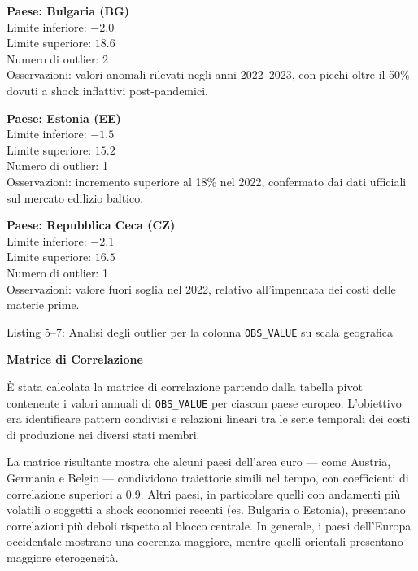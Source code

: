 \documentclass[conference]{IEEEtran}
\begin{document}
\vspace{1em}\noindent \textbf{Paese: Bulgaria (BG)} \\ Limite inferiore: $-2.0$ \\ Limite superiore: $18.6$ \\ Numero di outlier: 2 \\ Osservazioni: valori anomali rilevati negli anni 2022–2023, con picchi oltre il 50\% dovuti a shock inflattivi post-pandemici.

\vspace{1em} \noindent \textbf{Paese: Estonia (EE)} \\ Limite inferiore: $-1.5$ \\ Limite superiore: $15.2$ \\ Numero di outlier: 1 \\ Osservazioni: incremento superiore al 18\% nel 2022, confermato dai dati ufficiali sul mercato edilizio baltico.

\vspace{1em} \noindent \textbf{Paese: Repubblica Ceca (CZ)} \\ Limite inferiore: $-2.1$ \\ Limite superiore: $16.5$ \\ Numero di outlier: 1 \\ Osservazioni: valore fuori soglia nel 2022, relativo all’impennata dei costi delle materie prime.

\begin{flushright} Listing 5–7: Analisi degli outlier per la colonna \texttt{OBS\_VALUE} su scala geografica \end{flushright}

\vspace{1em} \noindent\textbf{Matrice di Correlazione}

È stata calcolata la matrice di correlazione partendo dalla tabella pivot contenente i valori annuali di \texttt{OBS\_VALUE} per ciascun paese europeo. L’obiettivo era identificare pattern condivisi e relazioni lineari tra le serie temporali dei costi di produzione nei diversi stati membri.

La matrice risultante mostra che alcuni paesi dell’area euro — come Austria, Germania e Belgio — condividono traiettorie simili nel tempo, con coefficienti di correlazione superiori a 0.9. Altri paesi, in particolare quelli con andamenti più volatili o soggetti a shock economici recenti (es. Bulgaria o Estonia), presentano correlazioni più deboli rispetto al blocco centrale. In generale, i paesi dell’Europa occidentale mostrano una coerenza maggiore, mentre quelli orientali presentano maggiore eterogeneità.
\end{document}
